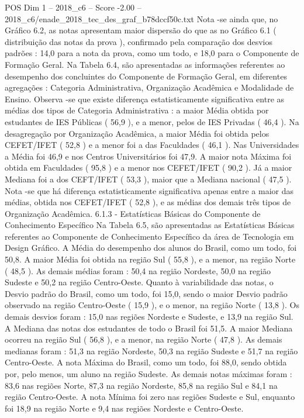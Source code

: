 \begin{textsample}{POS Dim 1 – 2018\_c6 – Score -2.00 – 2018\_c6/enade\_2018\_tec\_des\_graf\_b78dccf50c.txt}
Nota -se ainda que, no Gráfico 6.2, as notas apresentam maior dispersão do que as no Gráfico 6.1 ( distribuição das notas da prova ), confirmado pela comparação dos desvios padrões : 14,0 para a nota da prova, como um todo, e 18,0 para o Componente de Formação Geral.
Na Tabela 6.4, são apresentadas as informações referentes ao desempenho dos concluintes do Componente de Formação Geral, em diferentes agregações : Categoria Administrativa, Organização Acadêmica e Modalidade de Ensino.
Observa -se que existe diferença estatisticamente significativa entre as médias dos tipos de Categoria Administrativa : a maior Média obtida por estudantes de IES Públicas ( 56,9 ), e a menor, pelos de IES Privadas ( 46,4 ).
Na desagregação por Organização Acadêmica, a maior Média foi obtida pelos CEFET/IFET ( 52,8 ) e a menor foi a das Faculdades ( 46,1 ).
Nas Universidades a Média foi 46,9 e nos Centros Universitários foi 47,9.
A maior nota Máxima foi obtida em Faculdades ( 95,8 ) e a menor nos CEFET/IFET ( 90,2 ).
Já a maior Mediana foi a dos CEFT/IFET ( 53,3 ), maior que a Mediana nacional ( 47,5 ).
Nota -se que há diferença estatisticamente significativa apenas entre a maior das médias, obtida nos CEFET/IFET ( 52,8 ), e as médias dos demais três tipos de Organização Acadêmica. 6.1.3 - Estatísticas Básicas do Componente de Conhecimento Específico Na Tabela 6.5, são apresentadas as Estatísticas Básicas referentes ao Componente de Conhecimento Específico da área de Tecnologia em Design Gráfico.
A Média do desempenho dos alunos do Brasil, como um todo, foi 50,8.
A maior Média foi obtida na região Sul ( 55,8 ), e a menor, na região Norte ( 48,5 ).
As demais médias foram : 50,4 na região Nordeste, 50,0 na região Sudeste e 50,2 na região Centro-Oeste.
Quanto à variabilidade das notas, o Desvio padrão do Brasil, como um todo, foi 15,0, sendo o maior Desvio padrão observado na região Centro-Oeste ( 15,9 ), e o menor, na região Norte ( 13,8 ).
Os demais desvios foram : 15,0 nas regiões Nordeste e Sudeste, e 13,9 na região Sul.
A Mediana das notas dos estudantes de todo o Brasil foi 51,5.
A maior Mediana ocorreu na região Sul ( 56,8 ), e a menor, na região Norte ( 47,8 ).
As demais medianas foram : 51,3 na região Nordeste, 50,3 na região Sudeste e 51,7 na região Centro-Oeste.
A nota Máxima do Brasil, como um todo, foi 88,0, sendo obtida por, pelo menos, um aluno na região Sudeste.
As demais notas máximas foram : 83,6 nas regiões Norte, 87,3 na região Nordeste, 85,8 na região Sul e 84,1 na região Centro-Oeste.
A nota Mínima foi zero nas regiões Sudeste e Sul, enquanto foi 18,9 na região Norte e 9,4 nas regiões Nordeste e Centro-Oeste.

\end{textsample}

